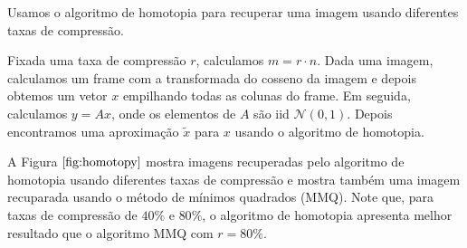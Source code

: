 Usamos o algoritmo de homotopia para recuperar uma imagem usando diferentes taxas de compressão.

Fixada uma taxa de compressão $r$, calculamos $m = r \cdot n$. Dada uma imagem, calculamos um frame com a transformada do cosseno da imagem e depois obtemos um vetor $x$ empilhando todas as colunas do frame. Em seguida, calculamos $y = Ax$, onde os elementos de $A$ são iid $\mathcal{N}(0,1)$. Depois encontramos uma aproximação $\tilde{x}$ para $x$ usando o algoritmo de homotopia.

A Figura $\ref{fig:homotopy}$ mostra imagens recuperadas pelo algoritmo de homotopia usando diferentes taxas de compressão e mostra também uma imagem recuparada usando o método de mínimos quadrados (MMQ). Note que, para taxas de compressão de $40\%$ e $80\%$, o algoritmo de homotopia apresenta melhor resultado que o algoritmo MMQ com $r = 80\%$.

